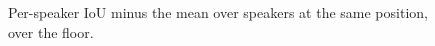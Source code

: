 \begin{figure}[t]
\centering

\caption{Per-speaker IoU minus the mean over speakers at the same position, over the floor.}
\label{fig:speaker_residual_map}
\end{figure}

